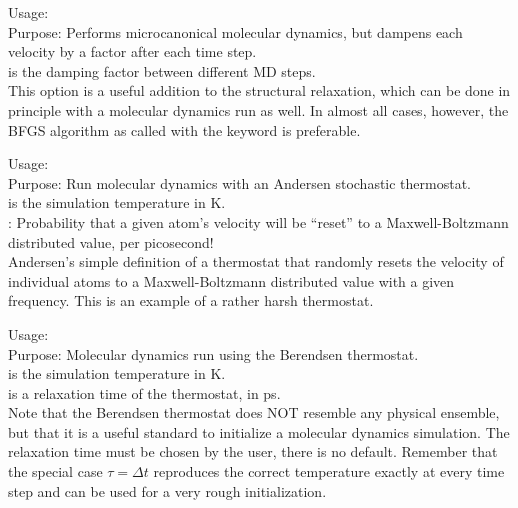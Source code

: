 {
  \noindent
  Usage:   
     \\[1.0ex]
  Purpose: Performs microcanonical molecular dynamics, but dampens
    each velocity by a factor  after each time
    step.\\[1.0ex] 
   is the damping factor between different MD
    steps. \\
}
This option is a useful addition to the structural relaxation, which
can be done in principle with a molecular dynamics run as well. In
almost all cases, however, the BFGS algorithm as called with the
 keyword is preferable. 

{\noindent
  Usage:   
    \\[1.0ex]
  Purpose: Run molecular dynamics with an Andersen stochastic 
    thermostat.\\[1.0ex]
   is the simulation temperature in K. \\
   : Probability that a given atom's velocity will be ``reset''
    to a Maxwell-Boltzmann distributed value, per picosecond!  \\
}
Andersen's \cite{Andersen80} simple definition of a thermostat that randomly
resets the velocity of individual atoms to a Maxwell-Boltzmann distributed
value with a given frequency. This is an example of a rather harsh thermostat.

{ \noindent
  Usage:   
    \\[1.0ex]
  Purpose: Molecular dynamics run using the Berendsen
    thermostat. \\[1.0ex]
   is the simulation temperature in K. \\
   is a relaxation time of the thermostat, in ps. \\
}
Note that the Berendsen thermostat does NOT resemble any physical
ensemble, but that it is a useful standard to initialize a molecular
dynamics simulation. The relaxation time  must be chosen
by the user, there is no default. Remember that the special case
$\tau=\Delta t$ reproduces the correct temperature exactly at every
time step and can be used for a very rough initialization. 

